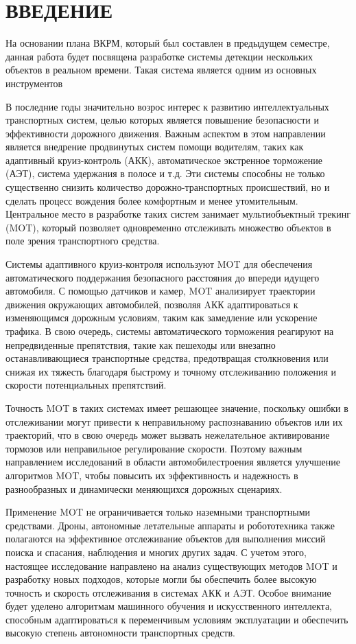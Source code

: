 \chapter*{ВВЕДЕНИЕ}

На основании плана ВКРМ, который был составлен в предыдущем семестре, данная 
работа будет посвящена разработке системы детекции нескольких объектов в 
реальном времени. Такая система является одним из основных инструментов

В последние годы значительно возрос интерес к развитию интеллектуальных транспортных систем, целью которых является повышение безопасности и эффективности дорожного движения. Важным аспектом в этом направлении является внедрение продвинутых систем помощи водителям, таких как адаптивный круиз-контроль (АКК), автоматическое экстренное торможение (АЭТ), система удержания в полосе и т.д. Эти системы способны не только существенно снизить количество дорожно-транспортных происшествий, но и сделать процесс вождения более комфортным и менее утомительным. Центральное место в разработке таких систем занимает мультиобъектный трекинг (MOT), который позволяет одновременно отслеживать множество объектов в поле зрения транспортного средства.

Системы адаптивного круиз-контроля используют MOT для обеспечения автоматического поддержания безопасного расстояния до впереди идущего автомобиля. С помощью датчиков и камер, MOT анализирует траектории движения окружающих автомобилей, позволяя AКК адаптироваться к изменяющимся дорожным условиям, таким как замедление или ускорение трафика. В свою очередь, системы автоматического торможения реагируют на непредвиденные препятствия, такие как пешеходы или внезапно останавливающиеся транспортные средства, предотвращая столкновения или снижая их тяжесть благодаря быстрому и точному отслеживанию положения и скорости потенциальных препятствий.

Точность MOT в таких системах имеет решающее значение, поскольку ошибки в отслеживании могут привести к неправильному распознаванию объектов или их траекторий, что в свою очередь может вызвать нежелательное активирование тормозов или неправильное регулирование скорости. Поэтому важным направлением исследований в области автомобилестроения является улучшение алгоритмов MOT, чтобы повысить их эффективность и надежность в разнообразных и динамически меняющихся дорожных сценариях.

Применение MOT не ограничивается только наземными транспортными средствами. Дроны, автономные летательные аппараты и робототехника также полагаются на эффективное отслеживание объектов для выполнения миссий поиска и спасания, наблюдения и многих других задач. С учетом этого, настоящее исследование направлено на анализ существующих методов MOT и разработку новых подходов, которые могли бы обеспечить более высокую точность и скорость отслеживания в системах AКК и AЭТ. Особое внимание будет уделено алгоритмам машинного обучения и искусственного интеллекта, способным адаптироваться к переменчивым условиям эксплуатации и обеспечить высокую степень автономности транспортных средств.

